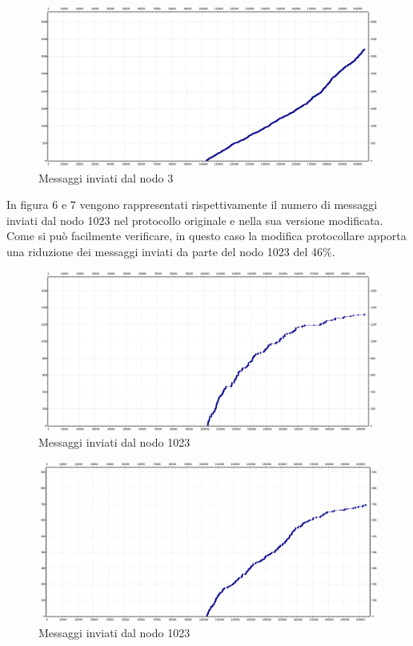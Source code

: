 \documentclass[	
	DIV=calc,
	paper=a4,
	fontsize=11pt,
	onecolumn
]{scrartcl} %
\begin{document}
\begin{figure}
	\centering
	\includegraphics[scale=0.35]{TwoThousandNodesNode3Mod.png}
	\caption{Messaggi inviati dal nodo 3}
	\label{Figura 5}
\end{figure}

In figura 6 e 7 vengono rappresentati rispettivamente il numero di messaggi inviati dal nodo 1023 nel protocollo originale e nella sua versione modificata. Come si può facilmente verificare, in questo caso la modifica protocollare apporta una riduzione dei messaggi inviati da parte del nodo 1023 del 46\%.

\begin{figure}
	\centering
	\includegraphics[scale=0.35]{TwoThousandNodesNode1023.png}
	\caption{Messaggi inviati dal nodo 1023}
	\label{Figura 6}
\end{figure}

\begin{figure}
	\centering
	\includegraphics[scale=0.35]{TwoThousandNodesNode1023Mod.png}
	\caption{Messaggi inviati dal nodo 1023}
	\label{Figura 7}
\end{figure}
\end{document}
